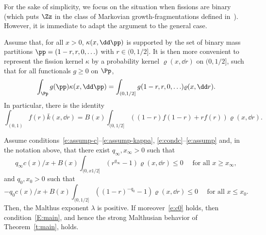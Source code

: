 For the sake of simplicity, we focus on the situation when fissions are binary (which puts $\Zz$ in the class of Markovian growth-fragmentations defined in~\cite{BeGF}). However, it is immediate to adapt the argument to the general case.

Assume that, for all $x>0$, $\kappa(x, \dd \pp)$ is supported by the set of binary mass partitions $\pp=(1-r,r, 0, \ldots)$ with $r\in(0,1/2]$. It is then more convenient to represent the fission kernel $\kappa$ by a probability kernel $\varrho(x,\dd r)$ on $(0,1/2]$, such that for all functionals $g\geq 0$ on $\Pp$,
\[
\int_{\Pp} g(\pp) \kappa(x, \dd \pp) = \int_{(0,1/2]} g(1-r,r, 0, \ldots) \varrho(x,\dd r).
\]
In particular, there is the identity
\[
\int_{(0,1)} f(r) \bar k (x,\dd r)= B(x)\int_{(0,1/2]} ((1-r) f(1-r)+ r f(r)) \varrho(x,\dd r).
\]

\begin{prop}\label{P1}
Assume conditions~\eqref{e:assump-c}--\eqref{e:assump-kappa}, \eqref{e:condc}--\eqref{e:assump} and, in the notation above, that there exist $q_{\infty}, x_{\infty}>0$ such that
\begin{equation}\label{e:Brho1}
q_{\infty} c(x)/x + B(x) \int_{(0,x1/2]} (r^{q_{\infty}}-1) \varrho (x, \dd r) \leq 0 \quad\text{ for all }x\geq x_{\infty},
\end{equation}
and $q_0, x_0>0$ such that
\begin{equation}\label{e:Brho2}
-q_0 c(x)/x + B(x) \int_{(0,1/2]} ((1-r)^{-q_0}-1) \varrho(x,\dd r) \leq 0 \quad\text{ for all }x\leq x_0.
\end{equation}
Then, the Malthus exponent $\lambda$ is positive. If moreover~\eqref{e:c0} holds, then condition~\eqref{E:main}, and hence the strong Malthusian behavior of Theorem~\ref{t:main}, holds.
\end{prop}

